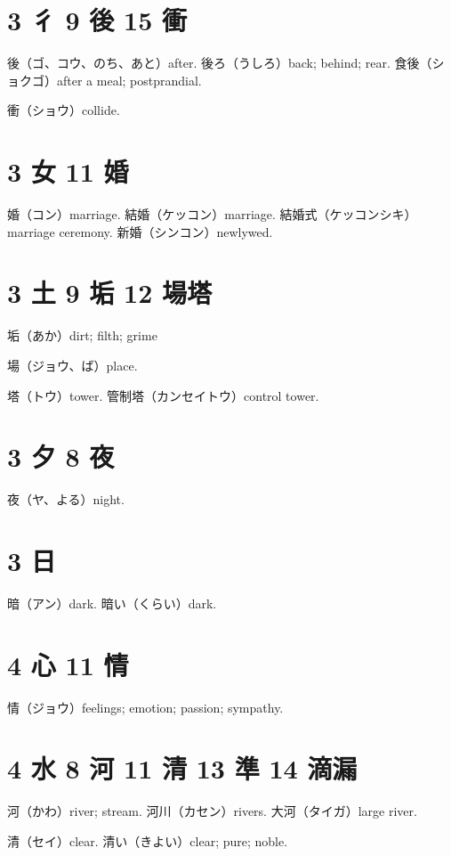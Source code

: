 \section{3 彳 9 後 15 衝}

後（ゴ、コウ、のち、あと）after.
後ろ（うしろ）back; behind; rear.
食後（ショクゴ）after a meal; postprandial.

衝（ショウ）collide.

\section{3 女 11 婚}

婚（コン）marriage.
結婚（ケッコン）marriage.
結婚式（ケッコンシキ）marriage ceremony.
新婚（シンコン）newlywed.

\section{3 土 9 垢 12 場塔}

垢（あか）dirt; filth; grime

場（ジョウ、ば）place.

塔（トウ）tower.
管制塔（カンセイトウ）control tower.

\section{3 夕 8 夜}

夜（ヤ、よる）night.

\section{3 日}

暗（アン）dark.
暗い（くらい）dark.

\section{4 心 11 情}

情（ジョウ）feelings; emotion; passion; sympathy.

\section{4 水 8 河 11 清 13 準 14 滴漏}

河（かわ）river; stream.
河川（カセン）rivers.
大河（タイガ）large river.

清（セイ）clear.
清い（きよい）clear; pure; noble.

